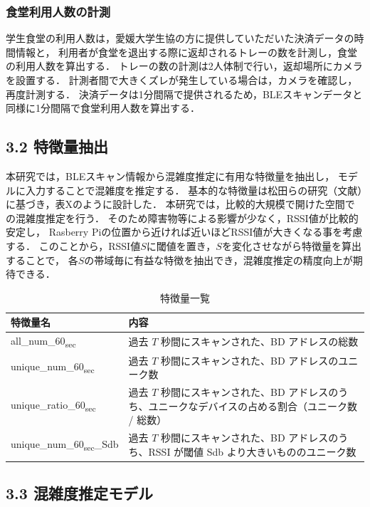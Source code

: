 \subsubsection*{食堂利用人数の計測}
学生食堂の利用人数は，愛媛大学生協の方に提供していただいた決済データの時間情報と，
利用者が食堂を退出する際に返却されるトレーの数を計測し，食堂の利用人数を算出する．
トレーの数の計測は2人体制で行い，返却場所にカメラを設置する．
計測者間で大きくズレが発生している場合は，カメラを確認し，再度計測する．
決済データは1分間隔で提供されるため，BLEスキャンデータと同様に1分間隔で食堂利用人数を算出する．

\subsection*{3.2 特徴量抽出}
本研究では，BLEスキャン情報から混雑度推定に有用な特徴量を抽出し，
モデルに入力することで混雑度を推定する．
基本的な特徴量は松田らの研究（文献）に基づき，表Xのように設計した．
本研究では，比較的大規模で開けた空間での混雑度推定を行う．
そのため障害物等による影響が少なく，RSSI値が比較的安定し，
Rasberry Piの位置から近ければ近いほどRSSI値が大きくなる事を考慮する．
このことから，RSSI値$S$に閾値を置き，$S$を変化させながら特徴量を算出することで，
各$S$の帯域毎に有益な特徴を抽出でき，混雑度推定の精度向上が期待できる．

\begin{table}[tb]
	\centering
	\caption{特徴量一覧}
	\label{tbl:feastures}
	\small
	\doublerulesep=0.3pt
    \begin{tabular}{l|p{5cm}} \hline\hline\hline
		特徴量名 & 内容 \\ \hline
		all\_num\_60\textsubscript{sec} & 過去 $T$ 秒間にスキャンされた、BD アドレスの総数\\ \hline
    unique\_num\_60\textsubscript{sec} & 過去 $T$ 秒間にスキャンされた、BD アドレスのユニーク数 \\ \hline
    unique\_ratio\_60\textsubscript{sec} & 過去 $T$ 秒間にスキャンされた、BD アドレスのうち、ユニークなデバイスの占める割合（ユニーク数 / 総数） \\ \hline
    unique\_num\_60\textsubscript{sec}\_Sdb & 過去 $T$ 秒間にスキャンされた、BD アドレスのうち、RSSI が閾値 Sdb より大きいもののユニーク数 \\ \hline\hline\hline
	\end{tabular}
\end{table}

\subsection*{3.3 混雑度推定モデル}


